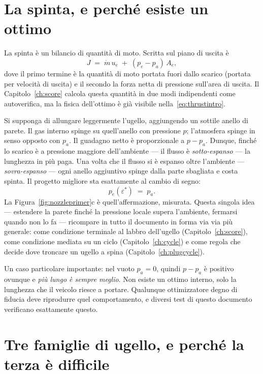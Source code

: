 \section{La spinta, e perché esiste un ottimo}

La spinta è un bilancio di quantità di moto. Scritta sul piano di
uscita è
\begin{equation}
J \;=\; \dot m\,u_e \;+\; (p_e - p_a)\,A_e ,
\label{eq:thrustintro}
\end{equation}
dove il primo termine è la quantità di moto portata fuori dallo
scarico (portata per velocità di uscita) e il secondo la forza netta
di pressione sull'area di uscita. Il Capitolo~\ref{ch:score} calcola
questa quantità in due modi indipendenti come autoverifica, ma la
fisica dell'ottimo è già visibile nella~\eqref{eq:thrustintro}.

Si supponga di allungare leggermente l'ugello, aggiungendo un
sottile anello di parete. Il gas interno spinge su quell'anello con
pressione $p$; l'atmosfera spinge in senso opposto con $p_a$. Il
guadagno netto è proporzionale a $p - p_a$. Dunque, finché lo
scarico è a pressione maggiore dell'ambiente --- il flusso è
\emph{sotto-espanso} --- la lunghezza in più paga. Una volta che il
flusso si è espanso oltre l'ambiente --- \emph{sovra-espanso} ---
ogni anello aggiuntivo spinge dalla parte sbagliata e costa spinta.
Il progetto migliore sta esattamente al cambio di segno:
\begin{equation}
p_e(\varepsilon^{*}) \;=\; p_a .
\label{eq:matchintro}
\end{equation}
La Figura~\ref{fig:nozzleprimer}c è quell'affermazione, misurata.
Questa singola idea --- estendere la parete finché la pressione
locale supera l'ambiente, fermarsi quando non lo fa --- ricompare in
tutto il documento in forma via via più generale: come condizione
terminale al labbro dell'ugello (Capitolo~\ref{ch:score}), come
condizione mediata su un ciclo (Capitolo~\ref{ch:cycle}) e come
regola che decide dove troncare un ugello a spina
(Capitolo~\ref{ch:plugcycle}).

Un caso particolare importante: nel vuoto $p_a = 0$, quindi
$p - p_a$ è positivo ovunque e \emph{più lungo è sempre meglio}. Non
esiste un ottimo interno, solo la lunghezza che il veicolo riesce a
portare. Qualunque ottimizzatore degno di fiducia deve riprodurre
quel comportamento, e diversi test di questo documento verificano
esattamente questo.

\section{Tre famiglie di ugello, e perché la terza è difficile}


